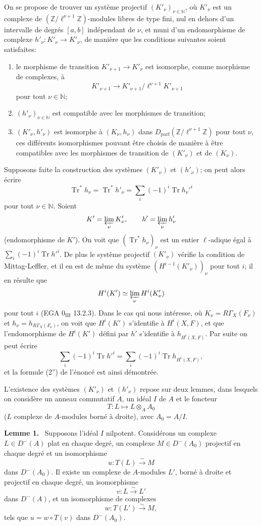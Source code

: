 \documentclass[11pt]{article}
\newenvironment{statement}[1]{\par\medskip\noindent\textbf{#1.}\ }{\par\medskip}
\providecommand{\Tr}{\operatorname{Tr}}
\providecommand{\Tr}{\operatorname{Tr}}
\providecommand{\Tr}{\operatorname{Tr}}
\providecommand{\Tr}{\operatorname{Tr}}
\providecommand{\Tr}{\operatorname{Tr}}
\begin{document}
On se propose de trouver un système projectif $(K'_\nu)_{\nu\in\mathbb N}$, où $K'_\nu$ est un complexe de $(\mathbb Z/\ell^{\nu+1}\mathbb Z)$-modules libres de type fini, nul en dehors d'un intervalle de degrés $[a,b]$ indépendant de $\nu$, et muni d'un endomorphisme de complexe $h'_\nu:K'_\nu\to K'_\nu$, de manière que les conditions suivantes soient satisfaites:
\begin{enumerate}[label=\arabic*)]
\item le morphisme de transition $K'_{\nu+1}\to K'_\nu$ est isomorphe, comme morphisme de complexes, à
\[
K'_{\nu+1}\to K'_{\nu+1}/\ell^{\nu+1}K'_{\nu+1}
\]
pour tout $\nu\in\mathbb N$;
\item $(h'_\nu)_{\nu\in\mathbb N}$ est compatible avec les morphismes de transition;
\item $(K'_\nu,h'_\nu)$ est isomorphe à $(K_\nu,h_\nu)$ dans $D_{\mathrm{parf}}(\mathbb Z/\ell^{\nu+1}\mathbb Z)$ pour tout $\nu$, ces différents isomorphismes pouvant être choisis de manière à être compatibles avec les morphismes de transition de $(K'_\nu)$ et de $(K_\nu)$.
\end{enumerate}
Supposons faite la construction des systèmes $(K'_\nu)$ et $(h'_\nu)$; on peut alors écrire
\[
\Tr^*h_\nu=\Tr^*h'_\nu=\sum_i(-1)^i\Tr h_\nu'^i
\]
pour tout $\nu\in\mathbb N$. Soient
\[
K'=\varprojlim_\nu K'_\nu,
\qquad h'=\varprojlim_\nu h'_\nu
\]
(endomorphisme de $K'$). On voit que $(\Tr^*h_\nu)_\nu$ est un entier $\ell$-adique égal à $\sum_i(-1)^i\Tr h'^i$. De plus le système projectif $(K'_\nu)$ vérifie la condition de Mittag-Leffler, et il en est de même du système $(H^{i-1}(K'_\nu))_\nu$ pour tout $i$; il en résulte que
\[
H^i(K')\simeq\varprojlim_\nu H^i(K'_\nu)
\]
pour tout $i$ (EGA $0_{\mathrm{III}}$ 13.2.3). Dans le cas qui nous intéresse, où $K_\nu=R\Gamma_X(F_\nu)$ et $h_\nu=h_{R\Gamma_X(F_\nu)}$, on voit que $H^i(K')$ s'identifie à $H^i(X,F)$, et que l'endomorphisme de $H^i(K')$ défini par $h'$ s'identifie à $h_{H^i(X,F)}$. Par suite on peut écrire
\[
\sum_i(-1)^i\Tr h'^i=
\sum_i(-1)^i\Tr h_{H^i(X,F)},
\]
et la formule (2'') de l'énoncé est ainsi démontrée.

L'existence des systèmes $(K'_\nu)$ et $(h'_\nu)$ repose sur deux lemmes, dans lesquels on considère un anneau commutatif $A$, un idéal $I$ de $A$ et le foncteur
\[
T:L\longmapsto L\otimes_A A_0
\]
($L$ complexe de $A$-modules borné à droite), avec $A_0=A/I$.

\begin{statement}{Lemme 1}
Supposons l'idéal $I$ nilpotent. Considérons un complexe $L\in D^-(A)$ plat en chaque degré, un complexe $M\in D^-(A_0)$ projectif en chaque degré et un isomorphisme
\[
u:T(L)\xrightarrow{\sim}M
\]
dans $D^-(A_0)$. Il existe un complexe de $A$-modules $L'$, borné à droite et projectif en chaque degré, un isomorphisme
\[
v:L\xrightarrow{\sim}L'
\]
dans $D^-(A)$, et un isomorphisme de complexes
\[
w:T(L')\xrightarrow{\sim}M,
\]
tels que $u=w\circ T(v)$ dans $D^-(A_0)$.
\end{statement}
\end{document}
